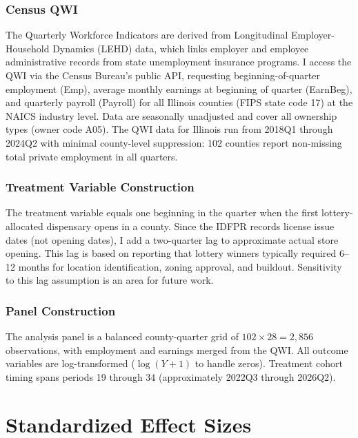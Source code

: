 \documentclass[12pt]{article}
\begin{document}
\subsubsection*{Census QWI} The Quarterly Workforce Indicators are derived from Longitudinal Employer-Household Dynamics (LEHD) data, which links employer and employee administrative records from state unemployment insurance programs. I access the QWI via the Census Bureau's public API, requesting beginning-of-quarter employment (Emp), average monthly earnings at beginning of quarter (EarnBeg), and quarterly payroll (Payroll) for all Illinois counties (FIPS state code 17) at the NAICS industry level. Data are seasonally unadjusted and cover all ownership types (owner code A05). The QWI data for Illinois run from 2018Q1 through 2024Q2 with minimal county-level suppression: 102 counties report non-missing total private employment in all quarters.

\subsubsection*{Treatment Variable Construction} The treatment variable equals one beginning in the quarter when the first lottery-allocated dispensary opens in a county. Since the IDFPR records license issue dates (not opening dates), I add a two-quarter lag to approximate actual store opening. This lag is based on reporting that lottery winners typically required 6--12 months for location identification, zoning approval, and buildout. Sensitivity to this lag assumption is an area for future work.

\subsubsection*{Panel Construction} The analysis panel is a balanced county-quarter grid of $102 \times 28 = 2{,}856$ observations, with employment and earnings merged from the QWI. All outcome variables are log-transformed ($\log(Y + 1)$ to handle zeros). Treatment cohort timing spans periods 19 through 34 (approximately 2022Q3 through 2026Q2).


\section{Standardized Effect Sizes}
\label{sec:sde}


\end{document}
